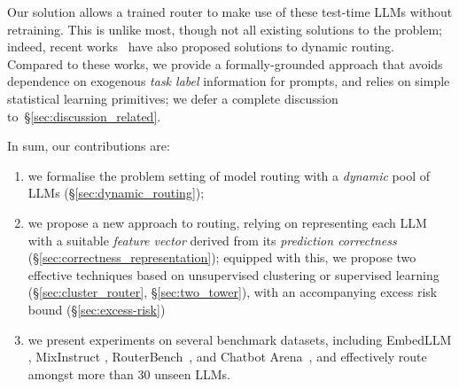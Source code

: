 Our solution allows a trained router to make use of these test-time LLMs without retraining.
This is unlike most, though not all existing solutions to the problem;
indeed, recent works~\citet{Feng:2024,Zhao:2024,Li:2025} have also proposed solutions to dynamic routing.
Compared to these works, we provide a formally-grounded approach that 
avoids dependence on exogenous \emph{task label} information for prompts, and relies on simple statistical learning primitives; 
we defer a complete discussion to~\S\ref{sec:discussion_related}.



In sum, our contributions are:
\begin{enumerate}[label=(\roman*),itemsep=0pt,topsep=0pt,leftmargin=16pt]
    \item we 
    formalise the
    problem setting of model routing with a \emph{dynamic} pool of LLMs (\S\ref{sec:dynamic_routing});

    \item we propose
    a new approach to routing,
    relying on representing each LLM with a suitable \emph{feature vector} derived from its \emph{prediction correctness} (\S\ref{sec:correctness_representation});
    equipped with this, 
    we propose two effective techniques 
    based on unsupervised clustering or supervised learning (\S\ref{sec:cluster_router}, \S\ref{sec:two_tower}), with an accompanying excess risk bound (\S\ref{sec:excess-risk})

    \item we present experiments on several benchmark datasets, including 
    EmbedLLM \citep{ZhuWuWen2024}, MixInstruct \citep{Jiang:2023}, RouterBench~\citep{HuBieLi2024}, and Chatbot Arena~\citep{OngAlmWu2024}, and effectively route amongst more than 30 unseen LLMs.
\end{enumerate}
